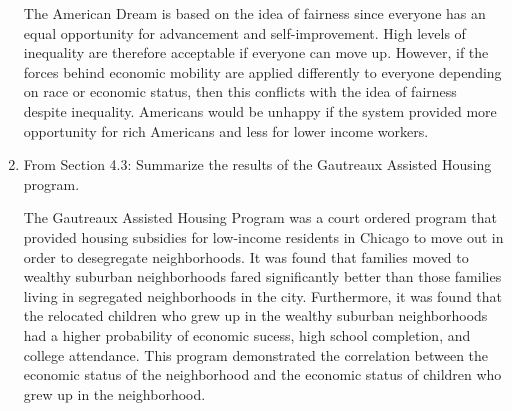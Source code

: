 \documentclass{article}
\begin{document}
\begin{enumerate}
  \par The American Dream is based on the idea of fairness since everyone has an equal opportunity for advancement and self-improvement. High levels of inequality are therefore acceptable if everyone can move up. However, if the forces behind economic mobility are applied differently to everyone depending on race or economic status, then this conflicts with the idea of fairness despite inequality. Americans would be unhappy if the system provided more opportunity for rich Americans and less for lower income workers.
  \item From Section 4.3: Summarize the results of the Gautreaux Assisted Housing program.
  \par The Gautreaux Assisted Housing Program was a court ordered program that provided housing subsidies for low-income residents in Chicago to move out in order to desegregate neighborhoods. It was found that families moved to wealthy suburban neighborhoods fared significantly better than those families living in segregated neighborhoods in the city. Furthermore, it was found that the relocated children who grew up in the wealthy suburban neighborhoods had a higher probability of economic sucess, high school completion, and college attendance. This program demonstrated the correlation between the economic status of the neighborhood and the economic status of children who grew up in the neighborhood.
\end{enumerate}
\end{document}
